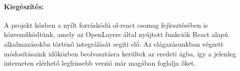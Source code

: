 \paragraph{Kiegészítés:}
A projekt közben a nyílt forráskódú ol-react csomag fejlesztésében is
közreműködtünk, amely az OpenLayers által nyújtott funkciók React alapú
alkalmazásokba történő integrálását segíti elő. Az elágazásunkban végzett
módosításaink időközben beolvasztásra kerültek az eredeti ágba, így a jelenleg
interneten elérhető legfrissebb verzió már magában foglalja őket.
